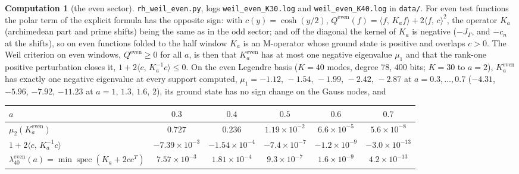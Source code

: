 \documentclass[11pt]{article}
\theoremstyle{definition}
\newtheorem{computation}[theorem]{Computation}
\theoremstyle{remark}
\newcommand{\ip}[2]{\langle #1,\, #2\rangle}
\begin{document}
\begin{computation}[the even sector]\label{comp:even}
\sloppy \texttt{rh\_weil\_even.py}, logs \texttt{weil\_even\_K30.log} and \texttt{weil\_even\_K40.log} in \texttt{data/}. For even test functions the polar term of the explicit formula has the opposite sign: with $c(y)=\cosh(y/2)$, $Q^{\mathrm{even}}(f)=\ip f{K_af}+2\ip fc^2$, the operator $K_a$ (archimedean part and prime shifts) being the same as in the odd sector; and off the diagonal the kernel of $K_a$ is negative ($-J_\Gamma$, and $-c_n$ at the shifts), so on even functions folded to the half window $K_a$ is an M-operator whose ground state is positive and overlaps $c>0$. The Weil criterion on even windows, $Q^{\mathrm{even}}\ge0$ for all $a$, is then that $K_a^{\mathrm{even}}$ has at most one negative eigenvalue $\mu_1$ and that the rank-one positive perturbation closes it, $1+2\ip c{K_a^{-1}c}\le0$. On the even Legendre basis ($K=40$ modes, degree $78$, $400$ bits; $K=30$ to $a=2$), $K_a^{\mathrm{even}}$ has exactly one negative eigenvalue at every support computed, $\mu_1=-1.12,\,-1.54,\,-1.99,\,-2.42,\,-2.87$ at $a=0.3,\dots,0.7$ ($-4.31$, $-5.96$, $-7.92$, $-11.23$ at $a=1,\,1.3,\,1.6,\,2$), its ground state has no sign change on the Gauss nodes, and
\begin{center}\footnotesize
\begin{tabular}{@{}lccccc@{}}
\toprule
$a$ & $0.3$ & $0.4$ & $0.5$ & $0.6$ & $0.7$\\
\midrule
$\mu_2(K_a^{\mathrm{even}})$ & $0.727$ & $0.236$ & $1.19\times10^{-2}$ & $6.6\times10^{-5}$ & $5.6\times10^{-8}$\\
$1+2\ip c{K_a^{-1}c}$ & $-7.39\times10^{-3}$ & $-1.54\times10^{-4}$ & $-7.4\times10^{-7}$ & $-1.2\times10^{-9}$ & $-3.0\times10^{-13}$\\
$\lambda^{\mathrm{even}}_{40}(a)=\min\operatorname{spec}(K_a+2cc^T)$ & $7.57\times10^{-3}$ & $1.81\times10^{-4}$ & $9.3\times10^{-7}$ & $1.6\times10^{-9}$ & $4.2\times10^{-13}$\\
\bottomrule
\end{tabular}
\end{center}

\end{computation}
\end{document}
